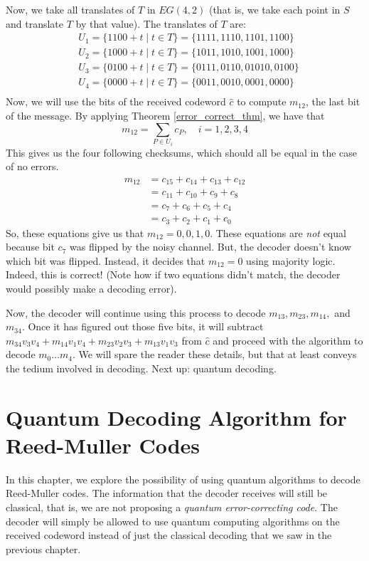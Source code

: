\documentclass[12pt,twoside]{reedthesis}
\theoremstyle{definition}
\begin{document}
Now, we take all translates of $T$ in $EG(4,2)$ (that is, we take each point in $S$ and translate $T$ by that value). The translates of $T$ are: 
\begin{align*}
& U_1 =  \{1100 + t \mid t \in T\} = \{1111, 1110, 1101, 1100\} \\
& U_2 = \{1000 + t \mid t \in T\} = \{1011, 1010, 1001, 1000\} \\
& U_3 = \{0100 + t \mid t \in T\} = \{0111, 0110, 01010, 0100\} \\
& U_4 =  \{0000 + t \mid t \in T\} = \{0011, 0010, 0001, 0000\} \\
\end{align*}
Now, we will use the bits of the received codeword $\hat{c}$ to compute $m_{12}$, the last bit of the message. By applying Theorem \ref{error_correct_thm}, we have that 
\begin{equation*}
m_{12}  = \sum_{P \in U_i} c_P, \quad i = 1,2,3,4 
\end{equation*}
This gives us the four following checksums, which should all be equal in the case of no errors.
\begin{align*}
 m_{12} 
& = c_{15} + c_{14} + c_{13} + c_{12}\\
& = c_{11} + c_{10} + c_{9} + c_{8}\\
& = c_{7} + c_{6} + c_{5} + c_{4} \\
& = c_{3} + c_2 + c_1 + c_0
\end{align*}
So, these equations give us that $m_{12} =0,0,1,0 $. These equations are \textit{not} equal because bit $c_7$ was flipped by the noisy channel. But, the decoder doesn't know which bit was flipped. Instead, it decides that $m_{12} = 0$ using majority logic. Indeed, this is correct! (Note how if two equations didn't match, the decoder would possibly make a decoding error).

Now, the decoder will continue using this process to decode $m_{13}, m_{23}, m_{14}, $ and $m_{34}$. Once it has figured out those five bits, it will subtract $m_{34}v_3v_4 + m_{14}v_1v_4 + m_{23}v_2v_3 + m_{13}v_1v_3$ from $\hat{c}$ and proceed with the algorithm to decode $m_0 \ldots m_4$. We will spare the reader these details, but that at least conveys the tedium involved in decoding. Next up: quantum decoding.

\chapter{Quantum Decoding Algorithm for Reed-Muller Codes}
In this chapter, we explore the possibility of using quantum algorithms to decode Reed-Muller codes. The information that the decoder receives will still be classical, that is, we are not proposing a \textit{quantum error-correcting code}. The decoder will simply be allowed to use quantum computing algorithms on the received codeword instead of just the classical decoding that we saw in the previous chapter.
\end{document}
